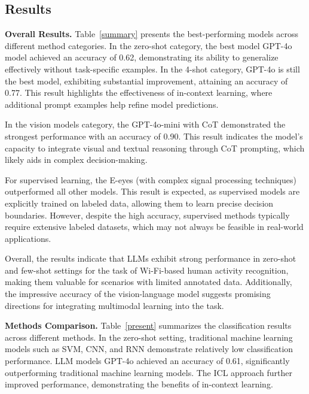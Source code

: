 \vspace{-2mm}


\subsection{Results}
\vspace{-2mm}


\textbf{Overall Results.} Table~\ref{summary} presents the best-performing models across different method categories. In the zero-shot category, the best model GPT-4o model achieved an accuracy of 0.62, demonstrating its ability to generalize effectively without task-specific examples. In the 4-shot category, GPT-4o is still the best model, exhibiting substantial improvement, attaining an accuracy of 0.77. This result highlights the effectiveness of in-context learning, where additional prompt examples help refine model predictions.

In the vision models category, the GPT-4o-mini with CoT demonstrated the strongest performance with an accuracy of 0.90. This result indicates the model's capacity to integrate visual and textual reasoning through CoT prompting, which likely aids in complex decision-making.

For supervised learning, the E-eyes (with complex signal processing techniques) outperformed all other models. This result is expected, as supervised models are explicitly trained on labeled data, allowing them to learn precise decision boundaries. However, despite the high accuracy, supervised methods typically require extensive labeled datasets, which may not always be feasible in real-world applications.


Overall, the results indicate that LLMs exhibit strong performance in zero-shot and few-shot settings for the task of Wi-Fi-based human activity recognition, making them valuable for scenarios with limited annotated data. Additionally, the impressive accuracy of the vision-language model suggests promising directions for integrating multimodal learning into the task.

% 

\textbf{Methods Comparison.}
Table~\ref{present} summarizes the classification results across different methods. In the zero-shot setting, traditional machine learning models such as SVM, CNN, and RNN demonstrate relatively low classification performance. LLM models GPT-4o achieved an accuracy of 0.61, significantly outperforming traditional machine learning models. The ICL approach further improved performance, demonstrating the benefits of in-context learning.



